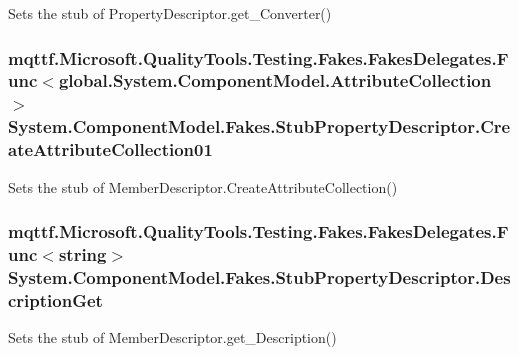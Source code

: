 Sets the stub of Property\-Descriptor.\-get\-\_\-\-Converter()

\hypertarget{class_system_1_1_component_model_1_1_fakes_1_1_stub_property_descriptor_a7e87a3ed4fe5ba338ae45b0a05a458db}{
\subsubsection[{Create\-Attribute\-Collection01}]{\setlength{\rightskip}{0pt plus 5cm}mqttf.\-Microsoft.\-Quality\-Tools.\-Testing.\-Fakes.\-Fakes\-Delegates.\-Func$<$global.\-System.\-Component\-Model.\-Attribute\-Collection$>$ System.\-Component\-Model.\-Fakes.\-Stub\-Property\-Descriptor.\-Create\-Attribute\-Collection01}}\label{class_system_1_1_component_model_1_1_fakes_1_1_stub_property_descriptor_a7e87a3ed4fe5ba338ae45b0a05a458db}


Sets the stub of Member\-Descriptor.\-Create\-Attribute\-Collection()

\hypertarget{class_system_1_1_component_model_1_1_fakes_1_1_stub_property_descriptor_acb12c5579adcf40e1bf90342a3b4624b}{
\subsubsection[{Description\-Get}]{\setlength{\rightskip}{0pt plus 5cm}mqttf.\-Microsoft.\-Quality\-Tools.\-Testing.\-Fakes.\-Fakes\-Delegates.\-Func$<$string$>$ System.\-Component\-Model.\-Fakes.\-Stub\-Property\-Descriptor.\-Description\-Get}}\label{class_system_1_1_component_model_1_1_fakes_1_1_stub_property_descriptor_acb12c5579adcf40e1bf90342a3b4624b}


Sets the stub of Member\-Descriptor.\-get\-\_\-\-Description()

